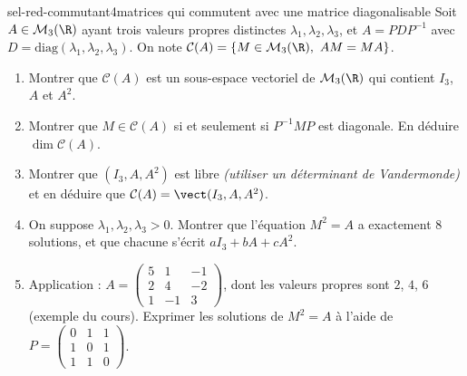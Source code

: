 \begin{exo}{sel-red-commutant}{4}{matrices qui commutent avec une matrice diagonalisable}
Soit $A\in\mathcal M_3(\R)$ ayant trois valeurs propres distinctes $\lambda_1,\lambda_2,\lambda_3$, et $A=PDP^{-1}$ avec
$D=\mathrm{diag}(\lambda_1,\lambda_2,\lambda_3)$. On note $\mathcal C(A)=\{M\in\mathcal M_3(\R),\ AM=MA\}$.
\begin{enumerate}
\item Montrer que $\mathcal C(A)$ est un sous-espace vectoriel de $\mathcal M_3(\R)$ qui contient $I_3$, $A$ et $A^2$.
\item Montrer que $M\in\mathcal C(A)$ si et seulement si $P^{-1}MP$ est diagonale. En déduire $\dim\mathcal C(A)$.
\item Montrer que $(I_3,A,A^2)$ est libre \emph{(utiliser un déterminant de Vandermonde)} et en déduire que $\mathcal C(A)=\vect(I_3,A,A^2)$.
\item On suppose $\lambda_1,\lambda_2,\lambda_3>0$. Montrer que l'équation $M^2=A$ a exactement $8$ solutions, et que chacune s'écrit
$aI_3+bA+cA^2$.
\item Application : $A=\begin{pmatrix}5&1&-1\\2&4&-2\\1&-1&3\end{pmatrix}$, dont les valeurs propres sont $2$, $4$, $6$ (exemple du cours).
Exprimer les solutions de $M^2=A$ à l'aide de $P=\begin{pmatrix}0&1&1\\1&0&1\\1&1&0\end{pmatrix}$.
\end{enumerate}
\end{exo}

